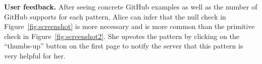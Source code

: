 {\bf User feedback.} After seeing concrete GitHub examples as well as the number of GitHub supports for each pattern, Alice can infer that the null check in Figure~\ref{fig:screenshot} is more necessary and is more common than the primitive check in Figure~\ref{fig:screenshot2}. She upvotes the pattern by clicking on the ``thumbs-up'' button on the first page to notify the server that this pattern is very helpful for her.




